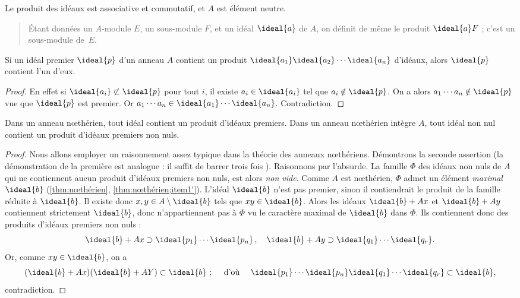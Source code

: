 \documentclass[11pt, useosf,
  title in boldface,
  theorem in new line,
  theorem numbering = section,
  number theorems separately,
]{simplivre}
\begin{document}
    Le produit des idéaux est associative et commutatif, et \( A \) est élément neutre.

    \begin{quote}
        Étant données un \( A \)‑module \( E \), un sous-module \( F \), et un idéal \( \ideal{a} \) de \( A \), on définit de même le produit \( \ideal{a} F \) ; c'est un sous-module de~\( E \).
    \end{quote}

    \begin{lemma}\label{lem:idéal premier qui contient un produit d'idéaux contient l'un d'eux}
        Si un idéal premier \( \ideal{p} \) d'un anneau \( A \) contient un produit \( \ideal{a_1} \ideal{a_2} \cdots \ideal{a_n} \) d'idéaux, alors \( \ideal{p} \) contient l'un d'eux.
    \end{lemma}
    \begin{proof}
        En effet si \( \ideal{a_i} \not\subset \ideal{p} \) pour tout \( i \), il existe \( a_i \in \ideal{a_i} \) tel que \( a_i \notin \ideal{p} \). On a alors \( a_1 \cdots a_n \notin \ideal{p} \) vue que \( \ideal{p} \) est premier. Or \( a_1 \cdots a_n \in \ideal{a_1} \cdots \ideal{a_n} \). Contradiction.
    \end{proof}

    \begin{lemma}\label{lem:anneau nœthérien;tout idéal contient un produit d'idéaux premiers}
        Dans un anneau nœthérien, tout idéal contient un produit d'idéaux premiers. Dans un anneau nœthérien intègre \( A \), tout idéal non nul contient un produit d'idéaux premiers non nuls.
    \end{lemma}
    \begin{proof}
        Nous allons employer un raisonnement assez typique dans la théorie des anneaux nœthériens. Démontrons la seconde assertion (la démonstration de la première est analogue : il suffit de barrer trois fois ). Raisonnons par l'absurde. La famille \( \Phi \) des idéaux non nuls de \( A \) qui ne contiennent aucun produit d'idéaux premiers non nuls, est alors \emph{non vide}. Comme \( A \) est nœthérien, \( \Phi \) admet un élément \emph{maximal} \( \ideal{b} \) (\cref{thm:nœthérien}, \ref{thm:nœthérien;item1'}). L'idéal \( \ideal{b} \) n'est pas premier, sinon il contiendrait le produit de la famille réduite à \( \ideal{b} \). Il existe donc \( x, y \in A \setminus \ideal{b} \) tels que \( xy \in \ideal{b} \). Alors les idéaux \( \ideal{b}+Ax \) et \( \ideal{b}+Ay \) contiennent strictement \( \ideal{b} \), donc n'appartiennent pas à \( \Phi \) vu le caractère maximal de \( \ideal{b} \) dans \( \Phi \). Ils contiennent donc des produits d'idéaux premiers non nuls :
        \[
            \ideal{b}+Ax \supset \ideal{p_1} \cdots \ideal{p_n}\,, \quad
            \ideal{b}+Ay \supset \ideal{q_1} \cdots \ideal{q_r}.
        \]
        Or, comme \( xy \in \ideal{b} \), on a
        \[
            (\ideal{b}+Ax)(\ideal{b}+AY) \subset \ideal{b} ~;
            \quad \text{ d'où } \quad
            \ideal{p_1} \cdots \ideal{p_n} \ideal{q_1} \cdots \ideal{q_r} \subset \ideal{b},
        \]
        contradiction.
    \end{proof}
\end{document}
